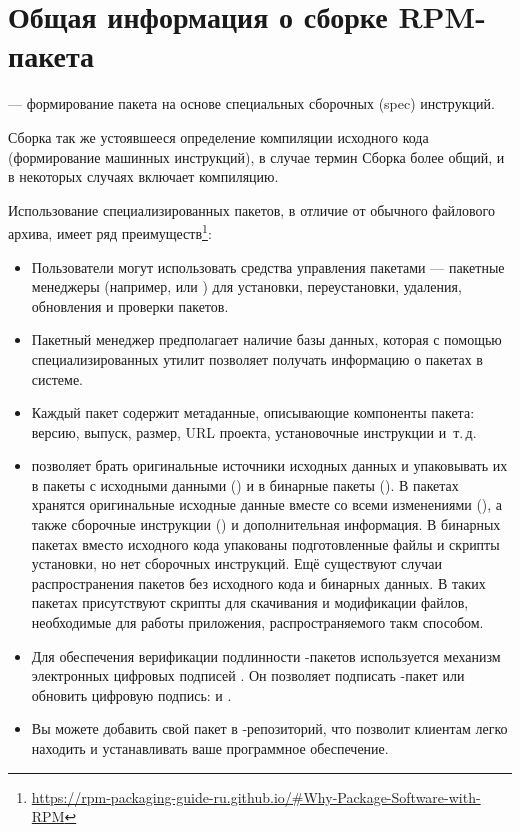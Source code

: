 \hypertarget{3}{\chapter{Общая информация о сборке RPM-пакета}}\label{software-used-for-packaging}

 --- формирование пакета на основе специальных сборочных (spec) инструкций.

Сборка так же устоявшееся определение компиляции исходного кода (формирование машинных
инструкций), в случае  термин Сборка более общий, и в некоторых случаях включает
компиляцию.

Использование специализированных пакетов, в отличие от обычного файлового архива, имеет ряд
преимуществ\footnote{\href{https://rpm-packaging-guide-ru.github.io/\#Why-Package-Software-with-RPM}
	{https://rpm-packaging-guide-ru.github.io/\#Why-Package-Software-with-RPM}}:

\begin{itemize}
	\item Пользователи могут использовать средства управления пакетами --- пакетные менеджеры
		(например,  или 	) для установки, переустановки, удаления,
		обновления и проверки  пакетов.
	\item Пакетный менеджер  предполагает наличие базы данных, которая с помощью специализированных
		утилит позволяет получать информацию о пакетах в системе.
	\item Каждый пакет  содержит метаданные, описывающие компоненты пакета: версию, выпуск,
		размер, URL проекта, установочные инструкции и~т.\,д.
	\item {} позволяет брать оригинальные источники исходных данных и упаковывать их в
		пакеты с исходными данными () и в бинарные пакеты (). В пакетах 
		хранятся оригинальные исходные данные вместе со всеми изменениями (), а также сборочные
		инструкции () и дополнительная информация. В бинарных пакетах вместо исходного кода
		упакованы подготовленные файлы и скрипты установки, но нет сборочных инструкций. Ещё существуют
		случаи распространения пакетов без исходного кода и бинарных данных. В таких пакетах присутствуют
		скрипты для скачивания и модификации файлов, необходимые для работы приложения, распространяемого такм способом.
	\item Для обеспечения верификации подлинности -пакетов используется механизм электронных цифровых
		подписей . Он позволяет подписать -пакет или обновить цифровую подпись:
	 и .
	\item Вы можете добавить свой пакет в -репозиторий, что позволит клиентам легко находить и
		устанавливать ваше программное обеспечение.
\end{itemize}

